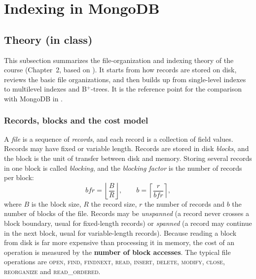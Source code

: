 \section{Indexing in MongoDB}
\label{sec:indexing}

\subsection{Theory (in class)}
\label{sec:index-theory}

This subsection summarizes the file-organization and indexing theory of the course
(Chapter~2, based on \cite{elmasri2016,dbms-ch2}). It starts from how records are stored on disk,
reviews the basic file organizations, and then builds up from single-level indexes to multilevel
indexes and B$^+$-trees. It is the reference point for the comparison with MongoDB in
.

\subsubsection{Records, blocks and the cost model}
A \emph{file} is a sequence of \emph{records}, and each record is a collection of field values.
Records may have fixed or variable length. Records are stored in disk \emph{blocks}, and the
block is the unit of transfer between disk and memory. Storing several records in one block is
called \emph{blocking}, and the \emph{blocking factor} is the number of records per block:
\[
bfr = \left\lfloor \frac{B}{R} \right\rfloor, \qquad
b = \left\lceil \frac{r}{bfr} \right\rceil ,
\]
where $B$ is the block size, $R$ the record size, $r$ the number of records and $b$ the number
of blocks of the file. Records may be \emph{unspanned} (a record never crosses a block boundary,
usual for fixed-length records) or \emph{spanned} (a record may continue in the next block, usual
for variable-length records). Because reading a block from disk is far more expensive than
processing it in memory, the cost of an operation is measured by the \textbf{number of block
accesses}. The typical file operations are \textsc{open}, \textsc{find}, \textsc{findnext},
\textsc{read}, \textsc{insert}, \textsc{delete}, \textsc{modify}, \textsc{close},
\textsc{reorganize} and \textsc{read\_ordered}.

